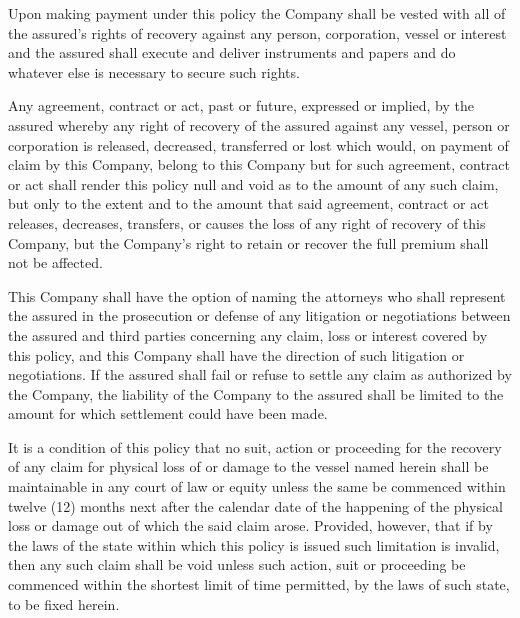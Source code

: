 \documentclass[10pt]{article}
\begin{document}
\begin{linenumbers}
Upon  making  payment  under  this  policy  the  Company  shall  be  vested  with  all  of  the  assured's  rights  of  recovery against   any   person,   corporation,   vessel   or   interest   and   the   assured   shall   execute   and   deliver   instruments and papers and do whatever else is necessary to secure such rights.

Any  agreement,  contract  or  act,  past  or  future,  expressed  or  implied,  by  the  assured  whereby  any  right  of  recovery of   the   assured   against   any   vessel,   person   or   corporation   is   released,   decreased,   transferred   or   lost   which would,  on  payment  of  claim  by  this  Company,  belong  to  this  Company  but  for  such  agreement,  contract  or  act  shall render  this policy  null  and  void  as  to  the  amount  of  any  such  claim,  but  only  to  the  extent  and  to  the  amount that said  agreement,  contract  or  act  releases,  decreases,  transfers,  or  causes  the  loss  of  any  right  of  recovery  of  this Company, but the Company's right to retain or recover the full premium shall not be affected.

This  Company  shall  have  the  option  of  naming  the  attorneys  who  shall  represent  the  assured  in  the  prosecution or  defense  of  any  litigation  or  negotiations  between  the  assured  and  third  parties  concerning  any  claim,  loss  or  interest covered by this policy, and this Company shall have  the direction of such litigation or negotiations. If the assured shall  fail  or  refuse  to  settle  any  claim  as  authorized  by  the  Company,  the  liability  of  the  Company  to  the  assured shall be limited to the amount for which settlement could have been made. 

It  is  a  condition  of  this  policy  that  no  suit,  action  or  proceeding  for  the  recovery  of  any  claim  for  physical loss  of  or  damage  to  the  vessel  named  herein  shall  be  maintainable  in  any  court  of  law  or  equity  unless  the  same be  commenced  within  twelve (12)  months  next  after  the  calendar  date  of  the  happening  of  the  physical  loss  or damage  out  of  which  the  said  claim  arose.  Provided,  however,  that  if  by  the  laws  of  the  state  within  which  this policy  is  issued  such  limitation  is  invalid,  then  any  such  claim  shall  be  void  unless  such  action,  suit  or  proceeding be commenced within the shortest limit of time permitted, by the laws of such state, to be fixed herein.


\end{linenumbers}
\end{document}
